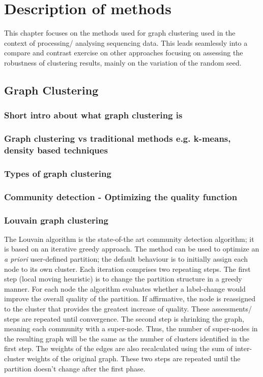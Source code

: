 \chapter{Description of methods}

This chapter focuses on the methods used for graph clustering used in the context of processing/ analysing sequencing data. This leads seamlessly into a compare and contrast exercise on other approaches focusing on assessing the robustness of clustering results, mainly on the variation of the random seed.

\section{Graph Clustering}

\subsection*{Short intro about what graph clustering is}

\subsection*{Graph clustering vs traditional methods e.g. k-means, density based techniques}

\subsection*{Types of graph clustering}

\subsection*{Community detection - Optimizing the quality function}

\subsection*{Louvain graph clustering}
The Louvain algorithm \cite{Blondel2008b} is the state-of-the art community detection algorithm; it is based on an iterative greedy approach. The method can be used to optimize an \textit{a priori} user-defined partition; the default behaviour is to initially assign each node to its own cluster.
Each iteration comprises two repeating steps. The first step (local moving heuristic) is to change the partition structure in a greedy manner. For each node the algorithm evaluates whether a label-change would improve the overall quality of the partition. If affirmative, the node is reassigned to the cluster that provides the greatest increase of quality. These assessments/ steps are repeated until convergence. The second step is shrinking the graph, meaning each community with a super-node. Thus, the number of super-nodes in the resulting graph will be the same as the number of clusters identified in the first step. The weights of the edges are also recalculated using the sum of inter-cluster weights of the original graph.
These two steps are repeated until the partition doesn't change after the first phase.

